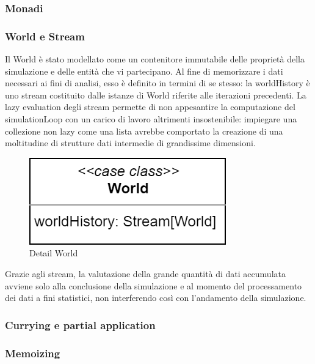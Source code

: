 \subsubsection{Monadi}


\subsubsection{World e Stream}
Il World è stato modellato come un contenitore immutabile delle proprietà della simulazione e delle entità che vi partecipano. Al fine di memorizzare i dati necessari ai fini di analisi, esso è definito in termini di se stesso: la worldHistory è uno stream costituito dalle istanze di World riferite alle iterazioni precedenti. La lazy evaluation degli stream permette di non appesantire la computazione del simulationLoop con un carico di lavoro altrimenti insostenibile: impiegare una collezione non lazy come una lista avrebbe comportato la creazione di una moltitudine di strutture dati intermedie di grandissime dimensioni. 

\begin{figure}[h!]
\centering
\includegraphics[width=\textwidth, scale=0.10]{img/WorldDetail.png}
\caption{Detail World}
\label{fig:modelhierarchy}
\end{figure}

Grazie agli stream, la valutazione della grande quantità di dati accumulata avviene solo alla conclusione della simulazione e al momento del processamento dei dati a fini statistici, non interferendo così con l’andamento della simulazione.

\subsubsection{Currying e partial application}


\subsubsection{Memoizing}



